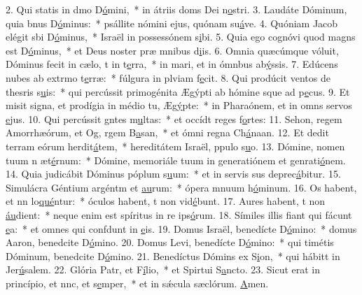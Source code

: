 2. Qui statis in dmo D\uline{ó}mini,~* in átriis doms Dei n\uline{o}stri.
3. Laudáte Dóminum, quia bnus D\uline{ó}minus:~* psállite nómini ejus, quónam su\uline{á}ve.
4. Quóniam Jacob elégit sbi D\uline{ó}minus,~* Israël in possessónem s\uline{i}bi.
5. Quia ego cognóvi quod magns est D\uline{ó}minus,~* et Deus noster præ mnibus d\uline{i}is.
6. Omnia quæcúmque vóluit, Dóminus fecit in cælo, t in t\uline{e}rra,~* in mari, et in ómnbus ab\uline{ý}ssis.
7. Edúcens nubes ab extrmo t\uline{e}rræ:~* fúlgura in plviam f\uline{e}cit.
8. Qui prodúcit ventos de thesris s\uline{u}is:~* qui percússit primogénita Ægýpti ab hómine sque ad p\uline{e}cus.
9. Et misit signa, et prodígia in médio tu, Æg\uline{ý}pte:~* in Pharaónem, et in omns servos \uline{e}jus.
10. Qui percússit gntes m\uline{u}ltas:~* et occídt reges f\uline{o}rtes:
11. Sehon, regem Amorrhæórum, et Og, rgem B\uline{a}san,~* et ómni regna Ch\uline{á}naan.
12. Et dedit terram eórum herdit\uline{á}tem,~* hereditátem Israël, ppulo s\uline{u}o.
13. Dómine, nomen tuum n æt\uline{é}rnum:~* Dómine, memoriále tuum in generatiónem et genrati\uline{ó}nem.
14. Quia judicábit Dóminus póplum s\uline{u}um:~* et in servis sus deprec\uline{á}bitur.
15. Simulácra Géntium argéntm et \uline{au}rum:~* ópera mnuum h\uline{ó}minum.
16. Os habent, et nn lo\uline{qué}ntur:~* óculos habent, t non vid\uline{é}bunt.
17. Aures habent, t non \uline{áu}dient:~* neque enim est spíritus in re ips\uline{ó}rum.
18. Símiles illis fiant qui fácunt \uline{e}a:~* et omnes qui confdunt in \uline{e}is.
19. Domus Israël, benedícte D\uline{ó}mino:~* domus Aaron, benedcite D\uline{ó}mino.
20. Domus Levi, benedícte D\uline{ó}mino:~* qui timétis Dóminum, benedcite D\uline{ó}mino.
21. Benedíctus Dómins ex S\uline{i}on,~* qui hábitt in Jer\uline{ú}salem.
22. Glória Patr, et F\uline{í}lio,~* et Spirtui S\uline{a}ncto.
23. Sicut erat in princípio, et nnc, et s\uline{e}mper,~* et in sǽcula sæclórum. \uline{A}men.
